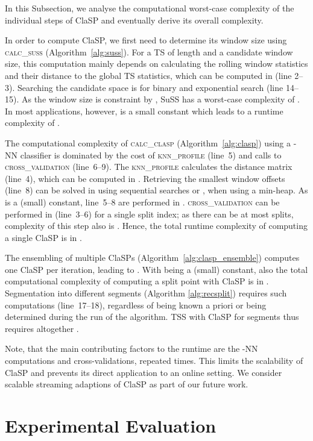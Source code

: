 \documentclass[pdflatex,sn-basic]{sn-jnl}
\begin{document}
In this Subsection, we analyse the computational worst-case complexity of the individual steps of ClaSP and eventually derive its overall complexity. 

In order to compute ClaSP, we first need to determine its window size using \textsc{calc\_suss} (Algorithm~\ref{alg:suss}). For a TS of length  and a candidate window size, this computation mainly depends on calculating the rolling window statistics and their distance to the global TS statistics, which can be computed in  (line 2--3). Searching the candidate space is  for binary and exponential search (line 14--15). As the window size is constraint by , SuSS has a worst-case complexity of . In most applications, however,  is a small constant which leads to a runtime complexity of .

The computational complexity of \textsc{calc\_clasp} (Algorithm~\ref{alg:clasp}) using a -NN classifier is dominated by the cost of \textsc{knn\_profile} (line~5) and  calls to \textsc{cross\_validation} (line~6--9). The \textsc{knn\_profile} calculates the distance matrix (line~4), which can be computed in  \citep{dokmanic2015euclidean, zhu2018matrix}. Retrieving the  smallest window offsets (line~8) can be solved in  using  sequential searches or , when using a min-heap. As  is a (small) constant, line~5--8 are performed in . \textsc{cross\_validation} can be performed in  (line~3--6) for a single split index; as there can be at most  splits, complexity of this step also is . Hence, the total runtime complexity of computing a single ClaSP is in . 

The ensembling of multiple ClaSPs (Algorithm~\ref{alg:clasp_ensemble}) computes one ClaSP per iteration, leading to . With  being a (small) constant, also the total computational complexity of computing a split point with ClaSP is in . Segmentation into  different segments (Algorithm \ref{alg:recsplit}) requires  such computations (line~17--18), regardless of  being known a priori or being determined during the run of the algorithm. TSS with ClaSP for  segments thus requires altogether . 

Note, that the main contributing factors to the runtime are the -NN computations and cross-validations, repeated  times. This limits the scalability of ClaSP and prevents its direct application to an online setting. We consider scalable streaming adaptions of ClaSP as part of our future work. 


\section{Experimental Evaluation}\label{sec:experiments}
\end{document}
